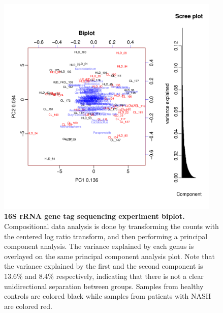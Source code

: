 \begin{figure}[h]
\begin{center}
\includegraphics[width=0.95\textwidth]{nafld_16s_biplot.png}
\caption[16S rRNA gene tag sequencing experiment biplot.]{\textbf{16S rRNA gene tag sequencing experiment biplot.} Compositional data analysis is done by transforming the counts with the centered log ratio transform, and then performing a principal component analysis. The variance explained by each genus is overlayed on the same principal component analysis plot. Note that the variance explained by the first and the second component is 13.6\% and 8.4\% respectively, indicating that there is not a clear unidirectional separation between groups. Samples from healthy controls are colored black while samples from patients with NASH are colored red. }
\label{nafld_16s_biplot}
\end{center}
\end{figure}


